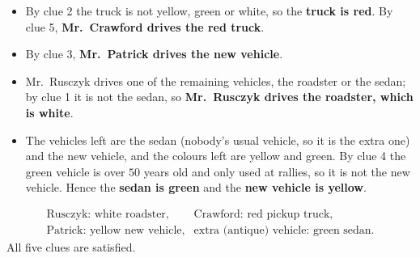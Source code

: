 \begin{itemize}
\item By clue 2 the truck is not yellow, green or white, so the \textbf{truck is red}. By clue 5, \textbf{Mr.\ Crawford drives the red truck}.
\item By clue 3, \textbf{Mr.\ Patrick drives the new vehicle}.
\item Mr.\ Rusczyk drives one of the remaining vehicles, the roadster or the sedan; by clue 1 it is not the sedan, so \textbf{Mr.\ Rusczyk drives the roadster, which is white}.
\item The vehicles left are the sedan (nobody's usual vehicle, so it is the extra one) and the new vehicle, and the colours left are yellow and green. By clue 4 the green vehicle is over $50$ years old and only used at rallies, so it is not the new vehicle. Hence the \textbf{sedan is green} and the \textbf{new vehicle is yellow}.
\end{itemize}
\[\boxed{\begin{array}{ll}\text{Rusczyk: white roadster,} & \text{Crawford: red pickup truck,}\\ \text{Patrick: yellow new vehicle,} & \text{extra (antique) vehicle: green sedan.}\end{array}}\]
All five clues are satisfied.
